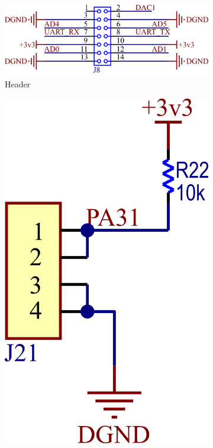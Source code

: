 \documentclass[../et.tex]{subfiles}
\begin{document}
\begin{figure}[!htbp]
  \begin{subfigure}[b]{\textwidth}
    \centering
    \includegraphics[scale=1.1]{../images/arm-header.png}
    \caption{Header}
    \label{fig:arm-header}
  \end{subfigure}

  \begin{subfigure}[b]{0.49\textwidth}
    \centering
    \includegraphics[scale=1.1]{../images/arm-button.png}

\end{subfigure}
\end{figure}
\end{document}
